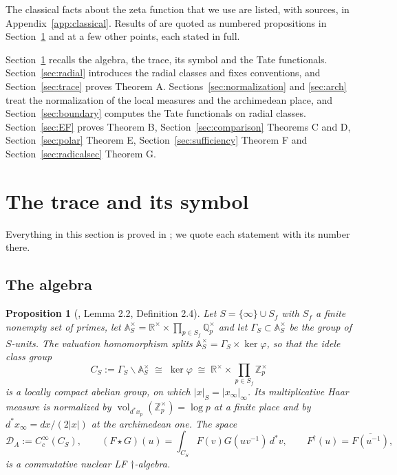 \documentclass[11pt]{amsart}
\newtheorem{proposition}[theorem]{Proposition}
\theoremstyle{definition}
\theoremstyle{remark}
\newcommand{\R}{\mathbb R}
\newcommand{\Z}{\mathbb Z}
\newcommand{\Q}{\mathbb Q}
\newcommand{\A}{\mathbb A}
\newcommand{\vol}{\operatorname{vol}}
\newcommand{\DA}{\mathcal D_A}
\newcommand{\CS}{C_S}
\begin{document}
The classical facts about the zeta function that we use are listed, with
sources, in Appendix~\ref{app:classical}.  Results of \cite{P43,P44} are
quoted as numbered propositions in Section~\ref{sec:carrier} and at a few
other points, each stated in full.

Section~\ref{sec:carrier} recalls the algebra, the trace, its symbol and the
Tate functionals.  Section~\ref{sec:radial} introduces the radial classes and
fixes conventions, and Section~\ref{sec:trace} proves Theorem A.
Sections~\ref{sec:normalization} and \ref{sec:arch} treat the normalization
of the local measures and the archimedean place, and
Section~\ref{sec:boundary} computes the Tate functionals on radial classes.
Section~\ref{sec:EF} proves Theorem B, Section~\ref{sec:comparison} Theorems C
and D, Section~\ref{sec:polar} Theorem E, Section~\ref{sec:sufficiency}
Theorem F and Section~\ref{sec:radicalsec} Theorem G.

\section{The trace and its symbol}
\label{sec:carrier}

Everything in this section is proved in \cite{P43}; we quote each statement
with its number there.

\subsection{The algebra}

\begin{proposition}[\cite{P43}, Lemma 2.2, Definition 2.4]
\label{prop:carrier}
Let $S=\{\infty\}\cup S_f$ with $S_f$ a finite nonempty set of primes, let
$\A_S^\times=\R^\times\times\prod_{p\in S_f}\Q_p^\times$ and let
$\Gamma_S\subset\A_S^\times$ be the group of $S$-units.  The valuation
homomorphism splits $\A_S^\times=\Gamma_S\times\ker\varphi$, so that the idele
class group
\[
  \CS:=\Gamma_S\backslash\A_S^\times\;\cong\;\ker\varphi\;\cong\;
  \R^\times\times\prod_{p\in S_f}\Z_p^\times
  \tag{2.1}
\]
is a locally compact abelian group, on which $|x|_S=|x_\infty|_\infty$.  Its
multiplicative Haar measure is normalized by
$\vol_{d^*x_p}(\Z_p^\times)=\log p$ at a finite place and by
$d^*x_\infty=dx/(2|x|)$ at the archimedean one.  The space
\[
  \DA:=C_c^\infty(\CS),\qquad
  (F\star G)(u)=\int_{\CS}F(v)G(uv^{-1})\,d^*v,\qquad
  F^\dagger(u)=\overline{F(u^{-1})},
  \tag{2.2}
\]
is a commutative nuclear LF $\dagger$-algebra.
\end{proposition}
\end{document}
